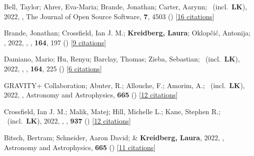 \item[{\color{numcolor}\scriptsize73}] Bell, Taylor; Ahrer, Eva-Maria; Brande, Jonathan; Carter, Aarynn; \etal\ (incl.\ \textbf{LK}), 2022, , The Journal of Open Source Software, \textbf{7}, 4503 () [\href{https://ui.adsabs.harvard.edu/abs/2022JOSS....7.4503B}{16 citations}]

\item[{\color{numcolor}\scriptsize72}] Brande, Jonathan; Crossfield, Ian J. M.; \textbf{Kreidberg, Laura}; Oklop{\v{c}}i{\'c}, Antonija; \etal, 2022, , \aj, \textbf{164}, 197 () [\href{https://ui.adsabs.harvard.edu/abs/2022AJ....164..197B}{9 citations}]

\item[{\color{numcolor}\scriptsize71}] Damiano, Mario; Hu, Renyu; Barclay, Thomas; Zieba, Sebastian; \etal\ (incl.\ \textbf{LK}), 2022, , \aj, \textbf{164}, 225 () [\href{https://ui.adsabs.harvard.edu/abs/2022AJ....164..225D}{6 citations}]

\item[{\color{numcolor}\scriptsize70}] GRAVITY+ Collaboration; Abuter, R.; Allouche, F.; Amorim, A.; \etal\ (incl.\ \textbf{LK}), 2022, , Astronomy and Astrophysics, \textbf{665} () [\href{https://ui.adsabs.harvard.edu/abs/2022A&A...665A..75G}{12 citations}]

\item[{\color{numcolor}\scriptsize69}] Crossfield, Ian J. M.; Malik, Matej; Hill, Michelle L.; Kane, Stephen R.; \etal\ (incl.\ \textbf{LK}), 2022, , \apj, \textbf{937} () [\href{https://ui.adsabs.harvard.edu/abs/2022ApJ...937L..17C}{12 citations}]

\item[{\color{numcolor}\scriptsize68}] Bitsch, Bertram; Schneider, Aaron David; \& \textbf{Kreidberg, Laura}, 2022, , Astronomy and Astrophysics, \textbf{665} () [\href{https://ui.adsabs.harvard.edu/abs/2022A&A...665A.138B}{11 citations}]

